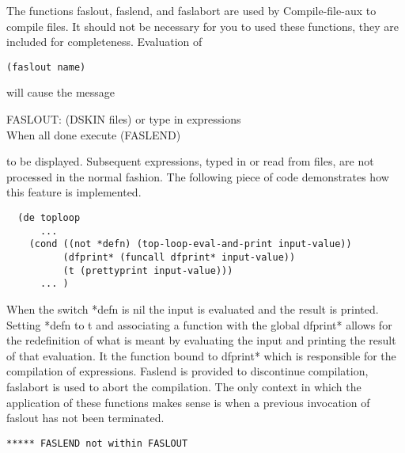   The functions faslout, faslend,  and  faslabort  are  used  by
Compile-file-aux  to  compile files.  It should not be necessary
for  you  to  used  these  functions,  they  are  included   for
completeness.  Evaluation of

\begin{verbatim}
(faslout name)
\end{verbatim}
will cause the message

FASLOUT: (DSKIN files) or type in expressions\\
When all done execute (FASLEND)

to  be displayed.  Subsequent expressions, typed in or read from
files, are not processed in the normal  fashion.  The  following
piece of code demonstrates how this feature is implemented.

\begin{verbatim}
  (de toploop
      ...
    (cond ((not *defn) (top-loop-eval-and-print input-value))
          (dfprint* (funcall dfprint* input-value))
          (t (prettyprint input-value)))
      ... )
\end{verbatim}
  When  the  switch  *defn is nil the input is evaluated and the
result is  printed.   Setting  *defn  to  t  and  associating  a
function with the global dfprint* allows for the redefinition of
what is meant by evaluating the input and printing the result of
that  evaluation.  It  the  function  bound to dfprint* which is
responsible for the compilation  of  expressions.    Faslend  is
provided  to discontinue compilation, faslabort is used to abort
the compilation.  The only context in which the  application  of
these  functions  makes  sense  is when a previous invocation of
faslout has not been terminated.

\begin{verbatim}
***** FASLEND not within FASLOUT
\end{verbatim}
